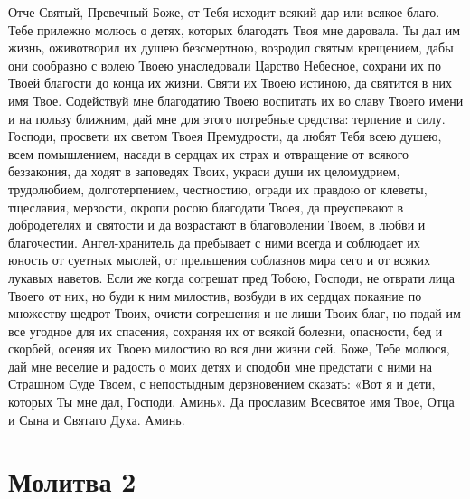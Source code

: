 Отче Святый, Превечный Боже, от Тебя исходит всякий дар или всякое благо. Тебе прилежно молюсь о детях, которых благодать Твоя мне даровала. Ты дал им жизнь, оживотворил их душею безсмертною, возродил святым крещением, дабы они сообразно с волею Твоею унаследовали Царство Небесное, сохрани их по Твоей благости до конца их жизни. Святи их Твоею истиною, да святится в них имя Твое. Содействуй мне благодатию Твоею воспитать их во славу Твоего имени и на пользу ближним, дай мне для этого потребные средства: терпение и силу. Господи, просвети их светом Твоея Премудрости, да любят Тебя всею душею, всем помышлением, насади в сердцах их страх и отвращение от всякого беззакония, да ходят в заповедях Твоих, украси души их целомудрием, трудолюбием, долготерпением, честностию, огради их правдою от клеветы, тщеславия, мерзости, окропи росою благодати Твоея, да преуспевают в добродетелях и святости и да возрастают в благоволении Твоем, в любви и благочестии. Ангел-хранитель да пребывает с ними всегда и соблюдает их юность от суетных мыслей, от прельщения соблазнов мира сего и от всяких лукавых наветов. Если же когда согрешат пред Тобою, Господи, не отврати лица Твоего от них, но буди к ним милостив, возбуди в их сердцах покаяние по множеству щедрот Твоих, очисти согрешения и не лиши Твоих благ, но подай им все угодное для их спасения, сохраняя их от всякой болезни, опасности, бед и скорбей, осеняя их Твоею милостию во вся дни жизни сей. Боже, Тебе молюся, дай мне веселие и радость о моих детях и сподоби мне предстати с ними на Страшном Суде Твоем, с непостыдным дерзновением сказать: «Вот я и дети, которых Ты мне дал, Господи. Аминь». Да прославим Всесвятое имя Твое, Отца и Сына и Святаго Духа. Аминь.


\section{Молитва 2}
 


